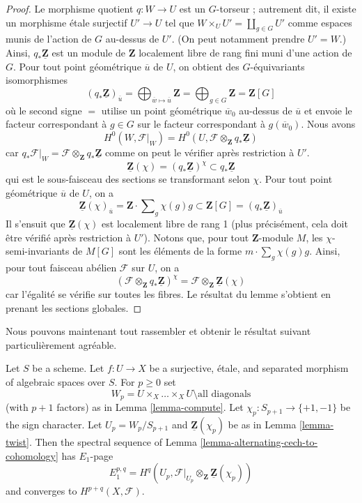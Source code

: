 \begin{proof}
Le morphisme quotient $q : W \to U$ est un $G$-torseur ; autrement dit, il existe
un morphisme étale surjectif $U' \to U$ tel que
$W \times_U U' = \coprod_{g \in G} U'$ comme espaces munis de l'action de $G$ au-dessus de $U'$.
(On peut notamment prendre $U' = W$.) Ainsi, $q_*\underline{\mathbf{Z}}$ est un
module de $\mathbf{Z}$ localement libre de rang fini muni d'une action de $G$.
Pour tout point géométrique $\overline{u}$ de $U$, on obtient des $G$-équivariants
isomorphismes
$$
(q_*\underline{\mathbf{Z}})_{\overline{u}}
= \bigoplus\nolimits_{\overline{w} \mapsto \overline{u}} \mathbf{Z}
= \bigoplus\nolimits_{g \in G} \mathbf{Z} = \mathbf{Z}[G]
$$
où le second signe $=$ utilise un point géométrique
$\overline{w}_0$ au-dessus de $\overline{u}$ et
envoie le facteur correspondant à $g \in G$ sur le facteur
correspondant à $g(\overline{w}_0)$. Nous avons
$$
H^0(W, \mathcal{F}|_W) =
H^0(U, \mathcal{F} \otimes_\mathbf{Z} q_*\underline{\mathbf{Z}})
$$
car
$q_*\mathcal{F}|_W = \mathcal{F} \otimes_\mathbf{Z} q_*\underline{\mathbf{Z}}$
comme on peut le vérifier après restriction à $U'$.
$$
\underline{\mathbf{Z}}(\chi) =
(q_*\underline{\mathbf{Z}})^\chi \subset
q_*\underline{\mathbf{Z}}
$$
qui est le sous-faisceau des sections se transformant selon $\chi$.
Pour tout point géométrique $\overline{u}$ de $U$, on a
$$
\underline{\mathbf{Z}}(\chi)_{\overline{u}} =
\mathbf{Z} \cdot \sum\nolimits_g \chi(g) g
\subset
\mathbf{Z}[G] = (q_*\underline{\mathbf{Z}})_{\overline{u}}
$$
Il s'ensuit que $\underline{\mathbf{Z}}(\chi)$ est localement libre de
rang 1 (plus précisément, cela doit être vérifié après restriction à $U'$).
Notons que, pour tout $\mathbf{Z}$-module $M$, les $\chi$-semi-invariants
de $M[G]$ sont les éléments de la forme $m \cdot \sum\nolimits_g \chi(g) g$.
Ainsi, pour tout faisceau abélien $\mathcal{F}$ sur $U$, on a
$$
\left(\mathcal{F} \otimes_\mathbf{Z} q_*\underline{\mathbf{Z}}\right)^\chi
=
\mathcal{F} \otimes_\mathbf{Z} \underline{\mathbf{Z}}(\chi)
$$
car l'égalité se vérifie sur toutes les fibres. Le résultat du lemme s'obtient en
prenant les sections globales.
\end{proof}

\noindent
Nous pouvons maintenant tout rassembler et obtenir le résultat suivant
particulièrement agréable.

\begin{lemma}
\label{lemma-alternating-spectral-sequence}
Let $S$ be a scheme. Let $f : U \to X$ be a surjective, \'etale, and
separated morphism of algebraic spaces over $S$. For $p \geq 0$ set
$$
W_p = U \times_X \ldots \times_X U \setminus \text{all diagonals}
$$
(with $p + 1$ factors) as in Lemma \ref{lemma-compute}.
Let $\chi_p : S_{p + 1} \to \{+1, -1\}$ be the sign character.
Let $U_p = W_p/S_{p + 1}$ and $\underline{\mathbf{Z}}(\chi_p)$ be as in
Lemma \ref{lemma-twist}.
Then the spectral sequence of
Lemma \ref{lemma-alternating-cech-to-cohomology}
has $E_1$-page
$$
E_1^{p, q} =
H^q(U_p, \mathcal{F}|_{U_p} \otimes_\mathbf{Z} \underline{\mathbf{Z}}(\chi_p))
$$
and converges to $H^{p + q}(X, \mathcal{F})$.
\end{lemma}

